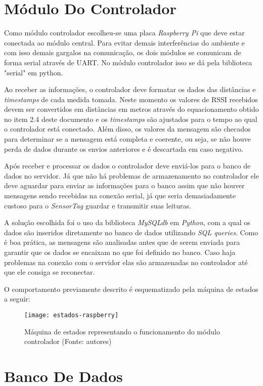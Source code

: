 \section{Módulo Do Controlador}

Como módulo controlador escolheu-se uma placa \emph{Raspberry Pi} que deve estar conectada ao módulo central. Para evitar demais interferências do ambiente e com isso demais gargalos na comunicação, os dois módulos se comunicam de forma serial através de UART. No módulo controlador isso se dá pela biblioteca "serial" em python.

Ao receber as informações, o controlador deve formatar os dados das distâncias e \emph{timestamps} de cada medida tomada. Neste momento os valores de RSSI recebidos devem ser convertidos em distâncias em metros através do equacionamento obtido no item 2.4 deste documento e os \emph{timestamps} são ajustados para o tempo ao qual o controlador está conectado. Além disso, os valores da mensagem são checados para determinar se a mensagem está completa e coerente, ou seja, se não houve perda de dados durante os envios anteriores e é descartada em caso negativo.

Após receber e processar os dados o controlador deve enviá-los para o banco de dados no servidor. Já que não há problemas de armazenamento no controlador ele deve aguardar para enviar as informações para o banco assim que não houver mensagens sendo recebidas na conexão serial, já que seria demasiadamente custoso para o \emph{SensorTag} guardar e transmitir suas leituras.

A solução escolhida foi o uso da biblioteca \emph{MySQLdb} em \emph{Python}, com a qual os dados são inseridos diretamente no banco de dados utilizando \emph{SQL queries}. Como é boa prática, as mensagens são analisadas antes que de serem enviada para garantir que os dados se encaixam no que foi definido no banco. Caso haja problemas na conexão com o servidor elas são armazenadas no controlador até que ele consiga se reconectar.

O comportamento previamente descrito é esquematizado pela máquina de estados a seguir:

\begin{figure}[ht]
  \centering
    \texttt{[image: estados-raspberry]}
  \caption{Máquina de estados representando o funcionamento do módulo controlador (Fonte: autores)}
\end{figure}
\FloatBarrier

\section{Banco De Dados}

